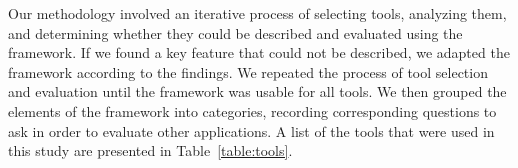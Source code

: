 \documentclass{sigchi}
\begin{document}
{Our methodology involved an iterative process of selecting tools, analyzing them, and determining whether they could be described and evaluated using the framework. If we found a key feature that could not be described, we adapted the framework according to the findings. We repeated the process of tool selection and evaluation until the framework was usable for all tools. We then grouped the elements of the framework into categories, recording corresponding questions to ask in order to evaluate other applications. 
%
A list of the tools that were used in this study are presented in Table~\ref{table:tools}.

\begin{table}[htbp]
\small
\begin{tabular}{|p{}| p{}| p{}|}


\end{tabular}
\end{table}}
\end{document}
